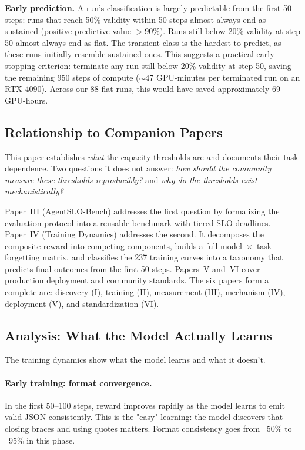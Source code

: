 \documentclass[11pt]{article}
\begin{document}
\textbf{Early prediction.} A run's classification is largely predictable from the first 50 steps: runs that reach 50\% validity within 50 steps almost always end as sustained (positive predictive value $>90$\%).  Runs still below 20\% validity at step 50 almost always end as flat.  The transient class is the hardest to predict, as these runs initially resemble sustained ones.  This suggests a practical early-stopping criterion: terminate any run still below 20\% validity at step 50, saving the remaining 950 steps of compute ($\sim$47 GPU-minutes per terminated run on an RTX 4090).  Across our 88 flat runs, this would have saved approximately 69 GPU-hours.

\subsection{Relationship to Companion Papers}
\label{sec:companion}

This paper establishes \emph{what} the capacity thresholds are and documents their task dependence.  Two questions it does not answer: \emph{how should the community measure these thresholds reproducibly?} and \emph{why do the thresholds exist mechanistically?}

Paper~III (AgentSLO-Bench) addresses the first question by formalizing the evaluation protocol into a reusable benchmark with tiered SLO deadlines.  Paper~IV (Training Dynamics) addresses the second.  It decomposes the composite reward into competing components, builds a full model~$\times$~task forgetting matrix, and classifies the 237 training curves into a taxonomy that predicts final outcomes from the first 50 steps.  Papers~V and~VI cover production deployment and community standards.  The six papers form a complete arc: discovery (I), training (II), measurement (III), mechanism (IV), deployment (V), and standardization (VI).

\subsection{Analysis: What the Model Actually Learns}

The training dynamics show what the model learns and what it doesn't.

\paragraph{Early training: format convergence.}
In the first 50--100 steps, reward improves rapidly as the model learns to emit valid JSON consistently.
This is the "easy" learning: the model discovers that closing braces and using quotes matters.
Format consistency goes from ~50\% to ~95\% in this phase.
\end{document}
